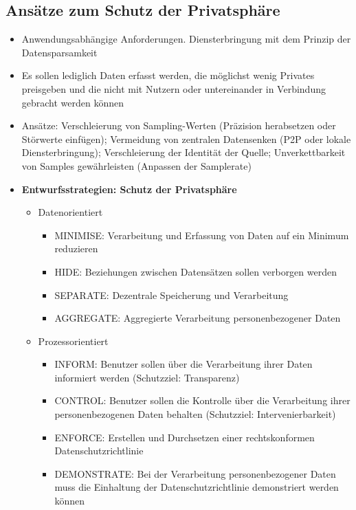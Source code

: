 \subsection{Ansätze zum Schutz der Privatsphäre}
\begin{itemize}
	\item Anwendungsabhängige Anforderungen. Diensterbringung mit dem Prinzip der Datensparsamkeit
	\item Es sollen lediglich Daten erfasst werden, die möglichst wenig Privates preisgeben und die nicht mit Nutzern oder untereinander in Verbindung gebracht werden können
	\item Ansätze: Verschleierung von Sampling-Werten (Präzision herabsetzen oder Störwerte einfügen); Vermeidung von zentralen Datensenken (P2P oder lokale Diensterbringung); Verschleierung der Identität der Quelle; Unverkettbarkeit von Samples gewährleisten (Anpassen der Samplerate)
	\item \textbf{Entwurfsstrategien: Schutz der Privatsphäre}
	\begin{itemize}
		\item Datenorientiert
		\begin{itemize}
			\item MINIMISE: Verarbeitung und Erfassung von Daten auf ein Minimum reduzieren
			\item HIDE: Beziehungen zwischen Datensätzen sollen verborgen werden
			\item SEPARATE: Dezentrale Speicherung und Verarbeitung
			\item AGGREGATE: Aggregierte Verarbeitung personenbezogener Daten
		\end{itemize}
		\item Prozessorientiert
		\begin{itemize}
			\item INFORM: Benutzer sollen über die Verarbeitung ihrer Daten informiert werden (Schutzziel: Transparenz)
			\item CONTROL: Benutzer sollen die Kontrolle über die Verarbeitung ihrer personenbezogenen Daten behalten (Schutzziel: Intervenierbarkeit)
			\item ENFORCE: Erstellen und Durchsetzen einer rechtskonformen Datenschutzrichtlinie
			\item DEMONSTRATE: Bei der Verarbeitung personenbezogener Daten muss die Einhaltung der Datenschutzrichtlinie demonstriert werden können
		\end{itemize}
	\end{itemize}
\end{itemize}

